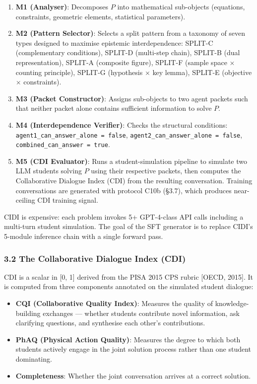 \documentclass[
  11pt,
]{article}
\providecommand{\tightlist}{%
  \setlength{\itemsep}{0pt}\setlength{\parskip}{0pt}}
\begin{document}
\begin{enumerate}
\def\labelenumi{\arabic{enumi}.}
\tightlist
\item
  \textbf{M1 (Analyser)}: Decomposes \(P\) into mathematical sub-objects
  (equations, constraints, geometric elements, statistical parameters).
\item
  \textbf{M2 (Pattern Selector)}: Selects a split pattern from a
  taxonomy of seven types designed to maximise epistemic
  interdependence: SPLIT-C (complementary conditions), SPLIT-D
  (multi-step chain), SPLIT-B (dual representation), SPLIT-A (composite
  figure), SPLIT-F (sample space $\times$ counting principle), SPLIT-G
  (hypothesis $\times$ key lemma), SPLIT-E (objective $\times$ constraints).
\item
  \textbf{M3 (Packet Constructor)}: Assigns sub-objects to two agent
  packets such that neither packet alone contains sufficient information
  to solve \(P\).
\item
  \textbf{M4 (Interdependence Verifier)}: Checks the structural
  conditions: \texttt{agent1\_can\_answer\_alone\ =\ false},
  \texttt{agent2\_can\_answer\_alone\ =\ false},
  \texttt{combined\_can\_answer\ =\ true}.
\item
  \textbf{M5 (CDI Evaluator)}: Runs a student-simulation pipeline to
  simulate two LLM students solving \(P\) using their respective
  packets, then computes the Collaborative Dialogue Index (CDI) from the
  resulting conversation. Training conversations are generated with
  protocol C10b (§3.7), which produces near-ceiling CDI training signal.
\end{enumerate}

CIDI is expensive: each problem invokes 5+ GPT-4-class API calls
including a multi-turn student simulation. The goal of the SFT generator
is to replace CIDI's 5-module inference chain with a single forward
pass.

\subsubsection{3.2 The Collaborative Dialogue Index
(CDI)}\label{the-collaborative-dialogue-index-cdi}

CDI is a scalar in {[}0, 1{]} derived from the PISA 2015 CPS rubric
{[}OECD, 2015{]}. It is computed from three components annotated on the
simulated student dialogue:

\begin{itemize}
\tightlist
\item
  \textbf{CQI (Collaborative Quality Index)}: Measures the quality of
  knowledge-building exchanges --- whether students contribute novel
  information, ask clarifying questions, and synthesise each other's
  contributions.
\item
  \textbf{PhAQ (Physical Action Quality)}: Measures the degree to which
  both students actively engage in the joint solution process rather
  than one student dominating.
\item
  \textbf{Completeness}: Whether the joint conversation arrives at a
  correct solution.
\end{itemize}
\end{document}
